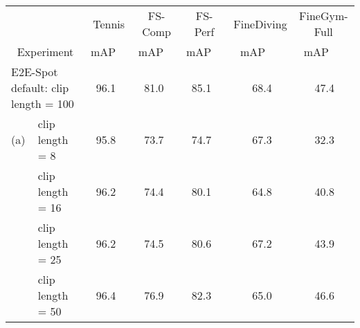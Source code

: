 \documentclass[runningheads]{llncs}
\newcommand{\OURMETHOD}{{E2E-Spot}\xspace}
\newcommand{\fscomp}{{FS-Comp}\xspace}
\newcommand{\fsperf}{{FS-Perf}\xspace}
\newcommand{\tennis}{{Tennis}\xspace}
\newcommand{\finegym}{{FineGym}\xspace}
\newcommand{\finediving}{{FineDiving}\xspace}
\newcommand{\nms}{\textsuperscript{\textdagger}}
\begin{document}
\renewcommand{\tabcolsep}{0.105cm}
\begin{table*}[t]
    \caption{{\bf Ablation and analysis experiments (mAP @ ).}
We compare to \OURMETHOD defaults in the top row (RegNet-Y 200MF w/ GSM and GRU).
(a) Varying clip lengths show that temporal context from longer clips is generally helpful.
(b) Removing temporal information in the feature extractor  (GSM) and in the stateful predictions  (GRU) generally reduces mAP.
(c) Reducing input resolution from 224 to 112 pixels reduces mAP.
(d) More complex models for  than the 1-layer GRU do not significantly improve mAP.
(e) Enlarging  to 800MF and/or adding flow can improve mAP slightly on some datasets.}
    \label{tab:ablation_ourmethod}
    {
    \tiny
    \centering
    \begin{tabularx}{\textwidth}{ll rr rr rr rr rr}
        \toprule
        & & \multicolumn{2}{c}{\tennis}
            & \multicolumn{2}{c}{\fscomp}
            & \multicolumn{2}{c}{\fsperf}
            & \multicolumn{2}{c}{\finediving}
            & \multicolumn{2}{c}{\finegym-Full} \\
        \multicolumn{2}{c}{Experiment}
            & \multicolumn{1}{c}{mAP} & \multicolumn{1}{c}{}
            & \multicolumn{1}{c}{mAP} & \multicolumn{1}{c}{}
            & \multicolumn{1}{c}{mAP} & \multicolumn{1}{c}{}
            & \multicolumn{1}{c}{mAP} & \multicolumn{1}{c}{}
            & \multicolumn{1}{c}{mAP} & \multicolumn{1}{c}{} \\
        \midrule
        \multicolumn{2}{l}{\OURMETHOD default: clip length = 100}
            & 96.1 &
            & \nms 81.0 &
            & \nms 85.1 &
            & 68.4 &
            & \nms 47.4 & \\
        \midrule
        (a)
        & \tabindent clip length = 8
            & \nms 95.8 & 
            & \nms 73.7 & 
            & \nms 74.7 & 
            & \nms 67.3 & 
            & \nms 32.3 &  \\
        & \tabindent clip length = 16
            & \nms 96.2 & 
            & \nms 74.4 & 
            & \nms 80.1 & 
            & \nms 64.8 & 
            & \nms 40.8 &  \\
        & \tabindent clip length = 25
            & \nms 96.2 & 
            & \nms 74.5 & 
            & \nms 80.6 & 
            & \nms 67.2 & 
            & \nms 43.9 &  \\
        & \tabindent clip length = 50
            & \nms 96.4 & 
            & \nms 76.9 & 
            & \nms 82.3 & 
            & 65.0 & 
            & \nms 46.6 &  \\

\end{tabularx}}
\end{table*}
\end{document}
